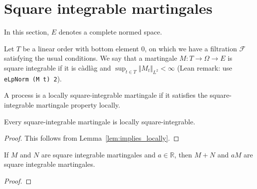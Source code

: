 \section{Square integrable martingales}

In this section, $E$ denotes a complete normed space.

\begin{definition}\label{def:IsSquareIntegrable}
  \leanok
Let $T$ be a linear order with bottom element 0, on which we have a filtration $\mathcal{F}$ satisfying the usual conditions.
We say that a martingale $M : T \to \Omega \to E$ is square integrable if it is càdlàg and $\sup_{t \in T} \Vert M_t \Vert_{L^2} < \infty$ (Lean remark: use \texttt{eLpNorm (M t) 2}).
\end{definition}


\begin{definition}\label{def:IsLocallySquareIntegrable}
  \leanok
A process is a locally square-integrable martingale if it satisfies the square-integrable
martingale property locally.
\end{definition}


\begin{lemma}\label{lem:IsSquareIntegrable.isLocallySquareIntegrable}
  \leanok
Every square-integrable martingale is locally square-integrable.
\end{lemma}

\begin{proof}\leanok
This follows from Lemma~\ref{lem:implies_locally}.
\end{proof}


\begin{lemma}\label{lem:IsSquareIntegrable.module}
  \leanok
If $M$ and $N$ are square integrable martingales and $a \in \mathbb{R}$, then $M + N$ and $a M$ are square integrable martingales.
\end{lemma}

\begin{proof}
\end{proof}


